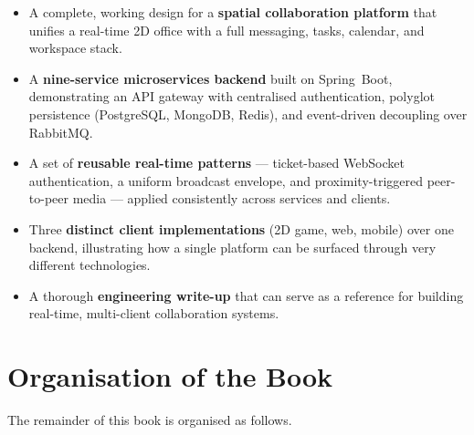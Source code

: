 \begin{itemize}
  \item A complete, working design for a \textbf{spatial collaboration platform}
  that unifies a real-time 2D office with a full messaging, tasks, calendar, and
  workspace stack.

  \item A \textbf{nine-service microservices backend} built on Spring~Boot,
  demonstrating an API gateway with centralised authentication, polyglot
  persistence (PostgreSQL, MongoDB, Redis), and event-driven decoupling over
  RabbitMQ.

  \item A set of \textbf{reusable real-time patterns} --- ticket-based WebSocket
  authentication, a uniform  broadcast envelope, and
  proximity-triggered peer-to-peer media --- applied consistently across
  services and clients.

  \item Three \textbf{distinct client implementations} (2D game, web, mobile)
  over one backend, illustrating how a single platform can be surfaced through
  very different technologies.

  \item A thorough \textbf{engineering write-up} that can serve as a reference
  for building real-time, multi-client collaboration systems.
\end{itemize}

\section{Organisation of the Book}

The remainder of this book is organised as follows.

